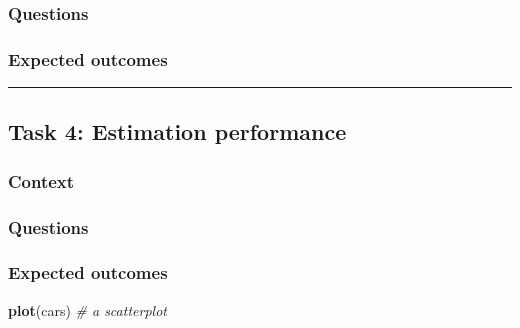 \documentclass[]{book}
\newenvironment{Shaded}{\begin{snugshade}}{\end{snugshade}}
\newcommand{\CommentTok}[1]{\textcolor[rgb]{0.56,0.35,0.01}{\textit{#1}}}
\newcommand{\KeywordTok}[1]{\textcolor[rgb]{0.13,0.29,0.53}{\textbf{#1}}}
\newcommand{\NormalTok}[1]{#1}
\theoremstyle{definition}
\theoremstyle{definition}
\theoremstyle{definition}
\theoremstyle{remark}
\begin{document}
\hypertarget{questions-10}{%
\subsubsection*{Questions}\label{questions-10}}

\hypertarget{expected-outcomes-10}{%
\subsubsection*{Expected outcomes}\label{expected-outcomes-10}}

\begin{center}\rule{0.5\linewidth}{\linethickness}\end{center}

\hypertarget{task-4-estimation-performance}{%
\subsection*{Task 4: Estimation
performance}\label{task-4-estimation-performance}}

\hypertarget{context-12}{%
\subsubsection*{Context}\label{context-12}}

\hypertarget{questions-11}{%
\subsubsection*{Questions}\label{questions-11}}

\hypertarget{expected-outcomes-11}{%
\subsubsection*{Expected outcomes}\label{expected-outcomes-11}}




\begin{Shaded}
\begin{Highlighting}[]
\KeywordTok{plot}\NormalTok{(cars)  }\CommentTok{# a scatterplot}
\end{Highlighting}
\end{Shaded}
\end{document}
